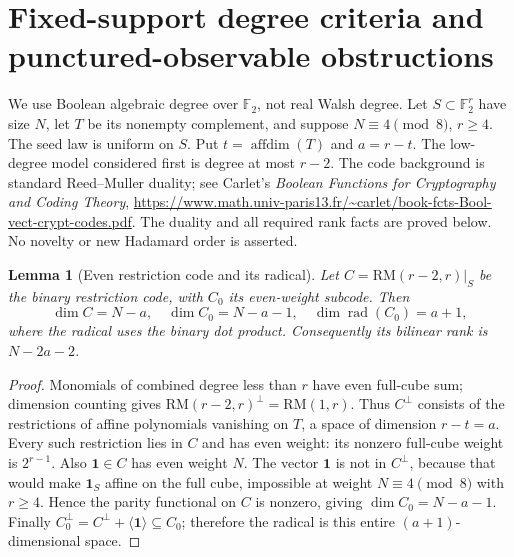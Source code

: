 \documentclass[11pt]{article}
\newtheorem{lemma}[theorem]{Lemma}
\begin{document}
\section{Fixed-support degree criteria and punctured-observable obstructions}
\label{sec:nonlinear-fixed-support}
We use Boolean algebraic degree over $\mathbb F_2$, not real Walsh degree.
Let $S\subset\mathbb F_2^r$ have size $N$, let $T$ be its nonempty
complement, and suppose $N\equiv4\pmod8$, $r\ge4$. The seed law is
uniform on $S$. Put $t=\operatorname{affdim}(T)$ and $a=r-t$.
The low-degree model considered first is degree at most $r-2$.
The code background is standard Reed--Muller duality; see Carlet's
\emph{Boolean Functions for Cryptography and Coding Theory},
\url{https://www.math.univ-paris13.fr/~carlet/book-fcts-Bool-vect-crypt-codes.pdf}.
The duality and all required rank facts are proved below. No novelty
or new Hadamard order is asserted.

\begin{lemma}[Even restriction code and its radical]
\label{lem:nonlinear-radical}
Let $C=\mathrm{RM}(r-2,r)|_S$ be the binary restriction code, with
$C_0$ its even-weight subcode. Then
\[
 \dim C=N-a,\quad \dim C_0=N-a-1,\quad
 \dim\operatorname{rad}(C_0)=a+1,
\]
where the radical uses the binary dot product. Consequently its bilinear
rank is $N-2a-2$.
\end{lemma}
\begin{proof}
Monomials of combined degree less than $r$ have even full-cube sum;
dimension counting gives $\mathrm{RM}(r-2,r)^\perp=\mathrm{RM}(1,r)$.
Thus $C^\perp$ consists of the restrictions of affine polynomials
vanishing on $T$, a space of dimension $r-t=a$. Every such restriction
lies in $C$ and has even weight: its nonzero full-cube weight is $2^{r-1}$.
Also $\mathbf1\in C$ has even weight $N$.
The vector $\mathbf1$ is not in $C^\perp$, because that would make
$\mathbf1_S$ affine on the full cube, impossible at weight
$N\equiv4\pmod8$ with $r\ge4$. Hence the parity functional on $C$ is
nonzero, giving $\dim C_0=N-a-1$. Finally
$C_0^\perp=C^\perp+\langle\mathbf1\rangle\subseteq C_0$;
therefore the radical is this entire $(a+1)$-dimensional space.
\end{proof}
\end{document}

